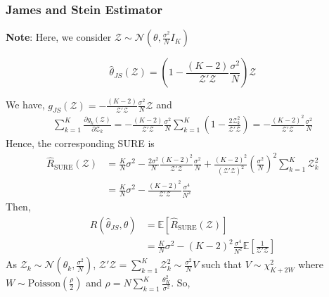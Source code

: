 \documentclass[11pt]{elegantbook}
\begin{document}
\subsubsection{James and Stein Estimator}
\textbf{Note}: Here, we consider $\mathcal{Z}\sim \mathcal{N}(\theta,\frac{\sigma^2}{N}I_K)$
\begin{theorem}
    $$\hat{\theta}_{JS}(\mathcal{Z})=\left(1-\frac{(K-2)}{\mathcal{Z}'\mathcal{Z}}\frac{\sigma^2}{N}\right)\mathcal{Z}$$
\end{theorem}
We have, $g_{JS}(\mathcal{Z})=-\frac{(K-2)}{\mathcal{Z}'\mathcal{Z}}\frac{\sigma^2}{N}\mathcal{Z}$ and
\begin{equation}
    \begin{aligned}
        \sum_{k=1}^K \frac{\partial g_k(\mathcal{Z})}{\partial \mathcal{Z}_k}=-\frac{(K-2)}{\mathcal{Z}'\mathcal{Z}}\frac{\sigma^2}{N}\sum_{k=1}^K\left(1-\frac{2 \mathcal{Z}_k^2}{\mathcal{Z}'\mathcal{Z}}\right)=-\frac{(K-2)^2}{\mathcal{Z}'\mathcal{Z}}\frac{\sigma^2}{N}
    \end{aligned}
    \nonumber
\end{equation}
Hence, the corresponding SURE is
\begin{equation}
    \begin{aligned}
        \hat{R}_\text{SURE}(\mathcal{Z})&=\frac{K}{N}\sigma^2-\frac{2\sigma^2}{N}\frac{(K-2)^2}{\mathcal{Z}'\mathcal{Z}}\frac{\sigma^2}{N}+\frac{(K-2)^2}{(\mathcal{Z}'\mathcal{Z})^2}\left(\frac{\sigma^2}{N}\right)^2\sum_{k=1}^K \mathcal{Z}_k^2\\
        &=\frac{K}{N}\sigma^2-\frac{(K-2)^2}{\mathcal{Z}'\mathcal{Z}}\frac{\sigma^4}{N^2}
    \end{aligned}
    \nonumber
\end{equation}
Then,
\begin{equation}
    \begin{aligned}
        R(\hat{\theta}_{JS},\theta)&=\mathbb{E}[\hat{R}_\text{SURE}(\mathcal{Z})]\\
        &=\frac{K}{N}\sigma^2-(K-2)^2\frac{\sigma^4}{N^2}\mathbb{E}\left[\frac{1}{\mathcal{Z}'\mathcal{Z}}\right]
    \end{aligned}
    \tag{RJS}
    \label{RJS}
\end{equation}
As $\mathcal{Z}_k\sim \mathcal{N}(\theta_k,\frac{\sigma^2}{N})$, $\mathcal{Z}'\mathcal{Z}=\sum_{k=1}^K \mathcal{Z}_k^2\sim \frac{\sigma^2}{N}V$ such that $V\sim \chi^2_{K+2W}$ where $W\sim \text{Poisson}(\frac{\rho}{2})$ and $\rho=N\sum_{k=1}^K \frac{\theta_K^2}{\sigma^2}$. So,
\end{document}
